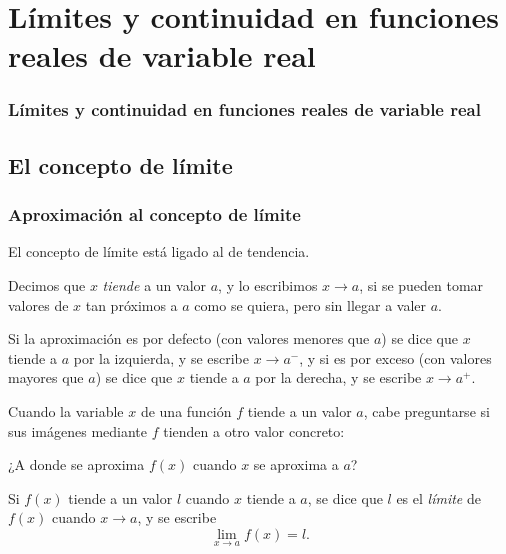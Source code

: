 \section{Límites y continuidad en funciones reales de variable real}

\begin{frame}
\frametitle{Límites y continuidad en funciones reales de variable real}
\tableofcontents[sectionstyle=show/hide,hideothersubsections]
\end{frame}



\subsection{El concepto de límite}
\begin{frame}
\frametitle{Aproximación al concepto de límite}
El concepto de límite está ligado al de tendencia.

Decimos que $x$ \emph{tiende} a un valor $a$, y lo escribimos $x\rightarrow a$, si se pueden tomar valores de $x$ tan próximos a $a$ como se quiera, pero sin llegar a valer $a$.

Si la aproximación es por defecto (con valores menores que $a$) se dice que $x$ tiende a $a$ por la izquierda, y se escribe $x\rightarrow a^-$, y si es por exceso (con valores mayores que $a$) se dice que $x$ tiende a $a$ por la derecha, y se escribe $x\rightarrow a^+$.

Cuando la variable $x$ de una función $f$ tiende a un valor $a$, cabe preguntarse si sus imágenes mediante $f$ tienden a otro valor concreto:
\begin{center}
\alert{¿A donde se aproxima $f(x)$ cuando $x$ se aproxima a $a$?}
\end{center}

Si $f(x)$ tiende a un valor $l$ cuando $x$ tiende a $a$, se dice que $l$ es el \emph{límite} de $f(x)$ cuando $x\rightarrow a$, y se escribe
\[\lim_{x\rightarrow a}f(x)=l.\]
\end{frame}



